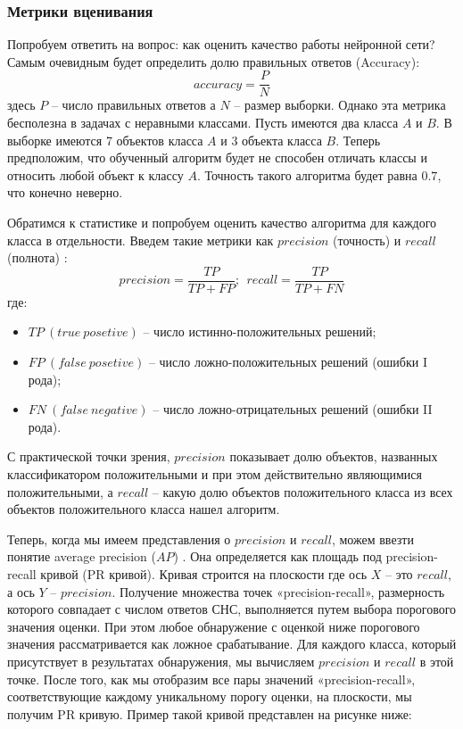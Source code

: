 \subsubsection{Метрики вценивания}

Попробуем ответить на вопрос: как оценить качество работы нейронной сети? Самым очевидным будет определить долю правильных ответов (Accuracy):
$$
accuracy = \frac{P}{N}
$$
здесь $P$ -- число правильных ответов а $N$ -- размер выборки. Однако эта метрика бесполезна в задачах с неравными классами. Пусть имеются два класса $A$ и $B$. В выборке имеются 7 объектов класса $A$ и 3 объекта класса $B$. Теперь предположим, что обученный алгоритм будет не способен отличать классы и относить любой объект к классу $A$. Точность такого алгоритма будет равна $0.7$, что конечно неверно.

Обратимся к статистике и попробуем оценить качество алгоритма для каждого класса в отдельности. Введем такие метрики как $precision$ (точность) и $recall$ (полнота) \cite{lib-ods-metrics}:
$$
precision = \frac{TP}{TP+FP};\ \ recall = \frac{TP}{TP+FN}
$$
где:
\begin{itemize}
    \item $TP\ (true\ posetive)$ -- число истинно-положительных решений;
    \item $FP\ (false\ posetive)$ -- число ложно-положительных решений (ошибки I рода);
    \item $FN\ (false\ negative)$ -- число ложно-отрицательных решений (ошибки II рода).
\end{itemize}

С практической точки зрения, $precision$ показывает долю объектов, названных классификатором положительными и при этом действительно являющимися положительными, а $recall$ -- какую долю объектов положительного класса из всех объектов положительного класса нашел алгоритм.

Теперь, когда мы имеем представления о $precision$ и $recall$, можем ввезти понятие average precision ($AP$) \cite{lib-map-metric}. Она определяется как площадь под precision-recall кривой (PR кривой). Кривая строится на плоскости где ось $X$ -- это $recall$, а ось $Y$ -- $precision$. Получение множества точек «precision-recall», размерность которого совпадает с числом ответов СНС, выполняется путем выбора порогового значения оценки. При этом любое обнаружение с оценкой ниже порогового значения рассматривается как ложное срабатывание. Для каждого класса, который присутствует в результатах обнаружения, мы вычисляем $precision$ и $recall$ в этой точке. После того, как мы отобразим все пары значений «precision-recall», соответствующие каждому уникальному порогу оценки, на плоскости, мы получим PR кривую. Пример такой кривой представлен на рисунке ниже:

